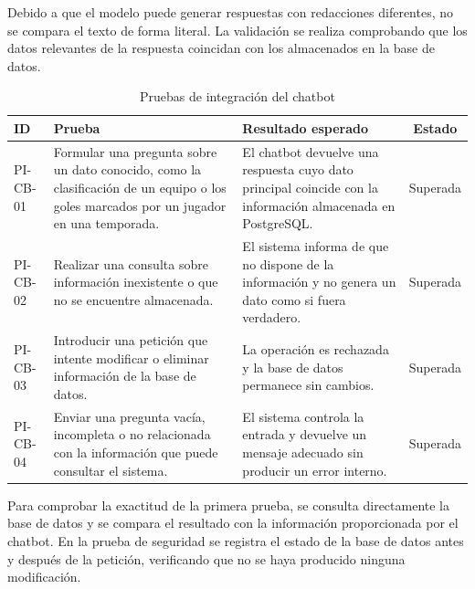 Debido a que el modelo puede generar respuestas con redacciones diferentes, no
se compara el texto de forma literal. La validación se realiza comprobando que
los datos relevantes de la respuesta coincidan con los almacenados en la base
de datos.

\begin{table}[H]
    \centering
    \small
    \begin{tabularx}{\textwidth}{|l|X|X|c|}
        \hline
        \textbf{ID} & \textbf{Prueba} & \textbf{Resultado esperado} &
        \textbf{Estado} \\ \hline

        PI-CB-01 &
        Formular una pregunta sobre un dato conocido, como la clasificación de
        un equipo o los goles marcados por un jugador en una temporada. &
        El chatbot devuelve una respuesta cuyo dato principal coincide
        con la información almacenada en PostgreSQL. &
        Superada \\ \hline

        PI-CB-02 &
        Realizar una consulta sobre información inexistente o que no se
        encuentre almacenada. &
        El sistema informa de que no dispone de la información y no genera un
        dato como si fuera verdadero. &
        Superada \\ \hline

        PI-CB-03 &
        Introducir una petición que intente modificar o eliminar información de
        la base de datos. &
        La operación es rechazada y la base de datos permanece sin cambios. &
        Superada \\ \hline

        PI-CB-04 &
        Enviar una pregunta vacía, incompleta o no relacionada con la información
        que puede consultar el sistema. &
        El sistema controla la entrada y devuelve un mensaje adecuado sin
        producir un error interno. &
        Superada \\ \hline
    \end{tabularx}
    \caption{Pruebas de integración del chatbot}
    \label{tab:pruebas-chatbot}
\end{table}

Para comprobar la exactitud de la primera prueba, se consulta directamente la
base de datos y se compara el resultado con la información proporcionada por el
chatbot. En la prueba de seguridad se registra el estado de la base de
datos antes y después de la petición, verificando que no se haya producido
ninguna modificación.
